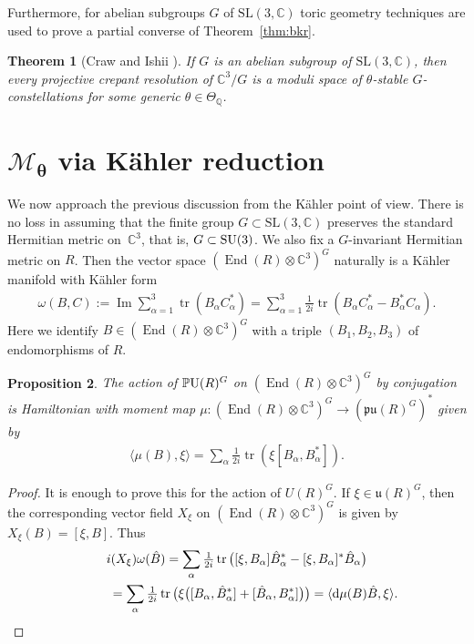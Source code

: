\documentclass[10pt,a4paper]{amsart}
\numberwithin{equation}{section}
\newcommand{\rd}{{\rm d}}
\newcommand{\sM}{\mathscr{M}}
\newcommand{\fu}{{\mathfrak u}}
\newcommand{\Q}{{\mathbb Q}}
\newcommand{\C}{{\mathbb C}}
\newcommand{\fpu}{\mathfrak{pu}}
\newcommand{\SU}{{\rm SU}}
\newcommand{\SL}{\mathrm{SL}}
\newcommand{\PU}{{\mathbb P}{\rm U}}
\newcommand{\End}{\operatorname{End}}
\newcommand{\tr}{\operatorname{tr}}
\newtheorem{Theorem}{Theorem}[section]
\newtheorem{Proposition}[Theorem]{Proposition}
 { \theoremstyle{definition}
\newtheorem{Definition}[Theorem]{Definition}
\newtheorem{Remark}[Theorem]{Remark} }
\begin{document}
Furthermore, for abelian subgroups $G$ of $\SL(3,\C)$ toric geometry
techniques are used to prove a partial converse of
Theorem~\ref{thm:bkr}.

\begin{Theorem}[Craw and Ishii ]\label{thm:ci-2}
  If $G$ is an abelian subgroup of $\SL(3,\C)$, then every projective
  crepant resolution of $\C^3/G$ is a moduli space of $\theta$-stable
  $G$-constellations for some generic $\theta\in\Theta_{\Q}$.
\end{Theorem}


\section[$\sM_\theta$ via K\"ahler reduction]{$\boldsymbol{\sM_\theta}$ via K\"ahler reduction}
\label{sec:kq}

We now approach the previous discussion from the K\"ahler point of view.
There is no loss in assuming that the f\/inite group $G\subset\SL(3,\C)$
preserves the standard Hermitian metric on~$\C^3$, that is,
$G\subset\SU(3)$.  We also f\/ix a $G$-invariant Hermitian metric on
$R$.
Then the vector space $(\End(R)\otimes\C^3)^G$ naturally is a K\"ahler
manifold with K\"ahler form
\begin{gather*}
  \omega(B,C)
  := \operatorname{Im} \sum_{\alpha=1}^3 \tr(B_\alpha C_\alpha^*)
   = \sum_{\alpha=1}^3 \tfrac{1}{2i}\tr(B_\alpha C_\alpha^*-B_\alpha^*C_\alpha).
\end{gather*}
Here we identify $B\in(\End(R)\otimes\C^3)^G$ with a triple
$(B_1,B_2,B_3)$ of endomorphisms of $R$.

\begin{Proposition}
  The action of $\PU(R)^G$ on $(\End(R)\otimes\C^3)^G$ by conjugation
  is Hamiltonian with moment map $\mu\colon (\End(R)\otimes\C^3)^G\to
  (\fpu(R)^G)^*$ given by
  \begin{gather*}
    \langle \mu(B),\xi\rangle =\sum_\alpha \tfrac{1}{2i} \tr(\xi
    [B_\alpha,B_\alpha^*]).
  \end{gather*}
\end{Proposition}

\begin{proof}
  It is enough to prove this for the action of $U(R)^G$.  If
  $\xi\in\fu(R)^G$, then the corresponding vector f\/ield $X_\xi$ on
  $(\End(R)\otimes\C^3)^G$ is given by $X_\xi(B) = [\xi,B].$ Thus
  \begin{gather*}
    i(X_\xi)\omega(\hat B)
      =\sum_\alpha \tfrac{1}{2i}\tr\big([\xi,B_\alpha] \hat
     B_\alpha^*-[\xi,B_\alpha]^*\hat B_\alpha\big) \\
\hphantom{i(X_\xi)\omega(\hat B)}{}
=\sum_\alpha \tfrac{1}{2i}\tr\big(\xi\big([B_\alpha,\hat
     B_\alpha^*]+[\hat B_\alpha,B_\alpha^*]\big)\big)
     =\langle \rd\mu(B)\hat B,\xi\rangle .\tag*{\qed}
  \end{gather*}
  \renewcommand{\qed}{}
\end{proof}
\end{document}
